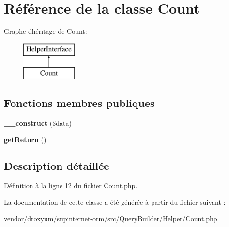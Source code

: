 \hypertarget{class_o_r_m_1_1_query_builder_1_1_helper_1_1_count}{}\section{Référence de la classe Count}
\label{class_o_r_m_1_1_query_builder_1_1_helper_1_1_count}
Graphe d\textquotesingle{}héritage de Count\+:\begin{figure}[H]
\begin{center}
\leavevmode
\includegraphics[height=2.000000cm]{class_o_r_m_1_1_query_builder_1_1_helper_1_1_count}
\end{center}
\end{figure}
\subsection*{Fonctions membres publiques}
\begin{DoxyCompactItemize}
\item 
{\bfseries \+\_\+\+\_\+construct} (\$data)\hypertarget{class_o_r_m_1_1_query_builder_1_1_helper_1_1_count_ab452db2d5d284bffa31c9accbaeec836}{}\label{class_o_r_m_1_1_query_builder_1_1_helper_1_1_count_ab452db2d5d284bffa31c9accbaeec836}

\item 
{\bfseries get\+Return} ()\hypertarget{class_o_r_m_1_1_query_builder_1_1_helper_1_1_count_a76a9e4fbc3017b3eb344ecb084f2c3a9}{}\label{class_o_r_m_1_1_query_builder_1_1_helper_1_1_count_a76a9e4fbc3017b3eb344ecb084f2c3a9}

\end{DoxyCompactItemize}


\subsection{Description détaillée}


Définition à la ligne 12 du fichier Count.\+php.



La documentation de cette classe a été générée à partir du fichier suivant \+:\begin{DoxyCompactItemize}
\item 
vendor/droxyum/supinternet-\/orm/src/\+Query\+Builder/\+Helper/Count.\+php\end{DoxyCompactItemize}
